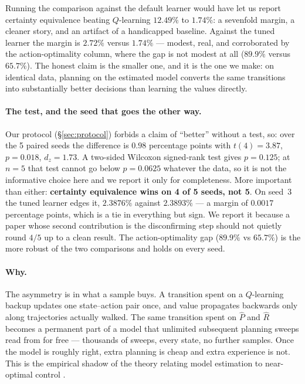 \documentclass[11pt]{article}
\begin{document}
Running the comparison against the default learner would have let us report certainty equivalence
beating $Q$-learning $12.49\%$ to $1.74\%$: a sevenfold margin, a cleaner story, and an artifact of
a handicapped baseline. Against the tuned learner the margin is $2.72\%$ versus $1.74\%$ --- modest,
real, and corroborated by the action-optimality column, where the gap is not modest at all
($89.9\%$ versus $65.7\%$). The honest claim is the smaller one, and it is the one we make: on
identical data, planning on the estimated model converts the same transitions into substantially
better decisions than learning the values directly.

\paragraph{The test, and the seed that goes the other way.} Our protocol (\S\ref{sec:protocol})
forbids a claim of ``better'' without a test, so: over the 5 paired seeds the difference is
$0.98$ percentage points with $t(4) = 3.87$, $p = 0.018$, $d_z = 1.73$. A two-sided Wilcoxon
signed-rank test gives $p = 0.125$; at $n = 5$ that test cannot go below $p = 0.0625$ whatever the
data, so it is not the informative choice here and we report it only for completeness. More
important than either: \textbf{certainty equivalence wins on 4 of 5 seeds, not 5}. On seed~3 the
tuned learner edges it, $2.3876\%$ against $2.3893\%$ --- a margin of $0.0017$ percentage points,
which is a tie in everything but sign. We report it because a paper whose second contribution is
the disconfirming step should not quietly round $4/5$ up to a clean result. The action-optimality
gap ($89.9\%$ vs $65.7\%$) is the more robust of the two comparisons and holds on every seed.

\paragraph{Why.} The asymmetry is in what a sample buys. A transition spent on a $Q$-learning
backup updates one state--action pair once, and value propagates backwards only along trajectories
actually walked. The same transition spent on $\hat{P}$ and $\hat{R}$ becomes a permanent part of a
model that unlimited subsequent planning sweeps read from for free --- thousands of sweeps, every
state, no further samples. Once the model is roughly right, extra planning is cheap and extra
experience is not. This is the empirical shadow of the theory relating model estimation to
near-optimal control \citep{kearns2002near, brafman2002rmax, mania2019certainty}.
\end{document}
